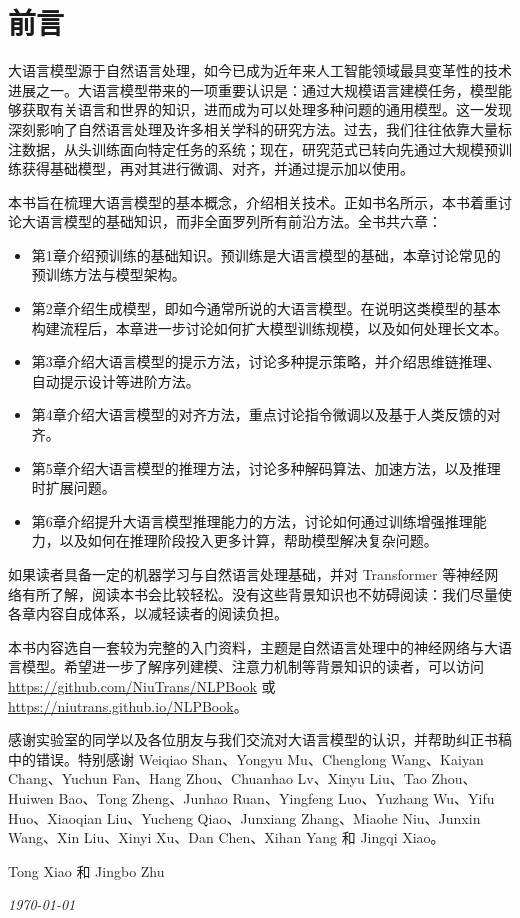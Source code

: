 \chapter*{前言}
\vspace{0.5em}
大语言模型源于自然语言处理，如今已成为近年来人工智能领域最具变革性的技术进展之一。大语言模型带来的一项重要认识是：通过大规模语言建模任务，模型能够获取有关语言和世界的知识，进而成为可以处理多种问题的通用模型。这一发现深刻影响了自然语言处理及许多相关学科的研究方法。过去，我们往往依靠大量标注数据，从头训练面向特定任务的系统；现在，研究范式已转向先通过大规模预训练获得基础模型，再对其进行微调、对齐，并通过提示加以使用。

本书旨在梳理大语言模型的基本概念，介绍相关技术。正如书名所示，本书着重讨论大语言模型的基础知识，而非全面罗列所有前沿方法。全书共六章：
\begin{itemize}
\item 第1章介绍预训练的基础知识。预训练是大语言模型的基础，本章讨论常见的预训练方法与模型架构。
\item 第2章介绍生成模型，即如今通常所说的大语言模型。在说明这类模型的基本构建流程后，本章进一步讨论如何扩大模型训练规模，以及如何处理长文本。
\item 第3章介绍大语言模型的提示方法，讨论多种提示策略，并介绍思维链推理、自动提示设计等进阶方法。
\item 第4章介绍大语言模型的对齐方法，重点讨论指令微调以及基于人类反馈的对齐。
\item 第5章介绍大语言模型的推理方法，讨论多种解码算法、加速方法，以及推理时扩展问题。
\item 第6章介绍提升大语言模型推理能力的方法，讨论如何通过训练增强推理能力，以及如何在推理阶段投入更多计算，帮助模型解决复杂问题。
\end{itemize}

如果读者具备一定的机器学习与自然语言处理基础，并对 Transformer 等神经网络有所了解，阅读本书会比较轻松。没有这些背景知识也不妨碍阅读：我们尽量使各章内容自成体系，以减轻读者的阅读负担。

本书内容选自一套较为完整的入门资料，主题是自然语言处理中的神经网络与大语言模型。希望进一步了解序列建模、注意力机制等背景知识的读者，可以访问 \url{https://github.com/NiuTrans/NLPBook} 或 \url{https://niutrans.github.io/NLPBook}。

感谢实验室的同学以及各位朋友与我们交流对大语言模型的认识，并帮助纠正书稿中的错误。特别感谢 Weiqiao Shan、Yongyu Mu、Chenglong Wang、Kaiyan Chang、Yuchun Fan、Hang Zhou、Chuanhao Lv、Xinyu Liu、Tao Zhou、Huiwen Bao、Tong Zheng、Junhao Ruan、Yingfeng Luo、Yuzhang Wu、Yifu Huo、Xiaoqian Liu、Yucheng Qiao、Junxiang Zhang、Miaohe Niu、Junxin Wang、Xin Liu、Xinyi Xu、Dan Chen、Xihan Yang 和 Jingqi Xiao。

\vspace{3em}
\begin{flushright}
Tong Xiao 和 Jingbo Zhu

\textit{\today}
\end{flushright}
